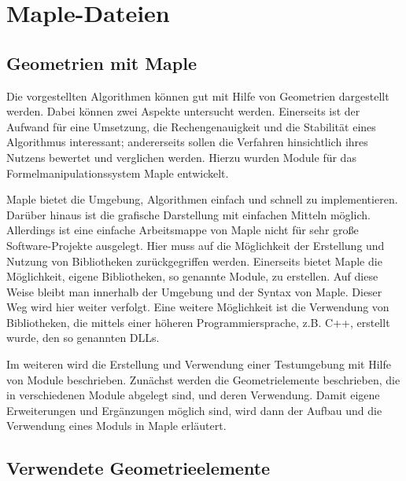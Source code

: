 %
%


\chapter{Maple-Dateien}

\autocite{Wat:2017a,Wat:2017b,Wat:2017c,Wat:2017d,Wat:2017e,Wat:2017f}

\section{Geometrien mit Maple}

Die vorgestellten Algorithmen können gut mit Hilfe von Geometrien dargestellt werden. Dabei können zwei Aspekte untersucht werden. Einerseits ist der Aufwand für eine Umsetzung, die Rechengenauigkeit und die Stabilität eines Algorithmus interessant; andererseits sollen die Verfahren hinsichtlich ihres Nutzens bewertet und verglichen werden. Hierzu wurden Module für das Formelmanipulationssystem Maple \autocite{Wat:2017a} entwickelt. 

Maple bietet die Umgebung, Algorithmen einfach und schnell zu implementieren. Darüber hinaus ist die grafische Darstellung mit einfachen Mitteln möglich. Allerdings ist eine einfache Arbeitsmappe 
von Maple nicht für sehr große Software-Projekte ausgelegt. Hier muss auf die Möglichkeit der Erstellung und Nutzung von Bibliotheken zurückgegriffen werden. Einerseits bietet Maple die Möglichkeit, eigene Bibliotheken, so genannte Module, zu erstellen. Auf diese Weise bleibt man innerhalb der Umgebung und der Syntax von Maple. Dieser Weg wird hier weiter verfolgt. Eine weitere Möglichkeit ist die Verwendung von Bibliotheken, die mittels einer höheren Programmiersprache, z.B. C++, erstellt wurde, den so genannten DLLs.

Im weiteren wird die Erstellung und Verwendung einer Testumgebung mit Hilfe von Module beschrieben. Zunächst werden die Geometrielemente beschrieben, die in verschiedenen Module abgelegt sind, und deren Verwendung. Damit eigene Erweiterungen und Ergänzungen möglich sind, wird dann der Aufbau und die Verwendung eines Moduls in Maple erläutert.



\section{Verwendete Geometrieelemente}

